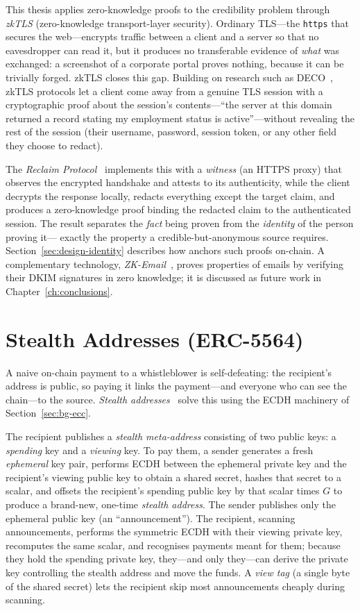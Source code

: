 This thesis applies zero-knowledge proofs to the credibility problem through
\emph{zkTLS} (zero-knowledge transport-layer security). Ordinary TLS---the
\texttt{https} that secures the web---encrypts traffic between a client and a
server so that no eavesdropper can read it, but it produces no transferable
evidence of \emph{what} was exchanged: a screenshot of a corporate portal proves
nothing, because it can be trivially forged. zkTLS closes this gap. Building on
research such as DECO~\cite{zhang2020deco}, zkTLS protocols let a client come away
from a genuine TLS session with a cryptographic proof about the session's
contents---``the server at this domain returned a record stating my employment
status is active''---without revealing the rest of the session (their username,
password, session token, or any other field they choose to redact).

The \emph{Reclaim Protocol}~\cite{reclaim} implements this with a
\emph{witness} (an HTTPS proxy) that observes the encrypted handshake and
attests to its authenticity, while the client decrypts the response locally,
redacts everything except the target claim, and produces a zero-knowledge proof
binding the redacted claim to the authenticated session. The result separates the
\emph{fact} being proven from the \emph{identity} of the person proving it---
exactly the property a credible-but-anonymous source requires.
Section~\ref{sec:design-identity} describes how \zkw anchors such proofs
on-chain. A complementary technology, \emph{ZK-Email}~\cite{zkemail}, proves
properties of emails by verifying their DKIM signatures in zero knowledge; it is
discussed as future work in Chapter~\ref{ch:conclusions}.

\section{Stealth Addresses (ERC-5564)}
\label{sec:bg-stealth}

A naive on-chain payment to a whistleblower is self-defeating: the recipient's
address is public, so paying it links the payment---and everyone who can see the
chain---to the source. \emph{Stealth addresses}~\cite{erc5564} solve this using
the ECDH machinery of Section~\ref{sec:bg-ecc}.

The recipient publishes a \emph{stealth meta-address} consisting of two public
keys: a \emph{spending} key and a \emph{viewing} key. To pay them, a sender
generates a fresh \emph{ephemeral} key pair, performs ECDH between the ephemeral
private key and the recipient's viewing public key to obtain a shared secret,
hashes that secret to a scalar, and offsets the recipient's spending public key
by that scalar times $G$ to produce a brand-new, one-time \emph{stealth address}.
The sender publishes only the ephemeral public key (an ``announcement''). The
recipient, scanning announcements, performs the symmetric ECDH with their viewing
private key, recomputes the same scalar, and recognises payments meant for them;
because they hold the spending private key, they---and only they---can derive the
private key controlling the stealth address and move the funds. A \emph{view tag}
(a single byte of the shared secret) lets the recipient skip most announcements
cheaply during scanning.

